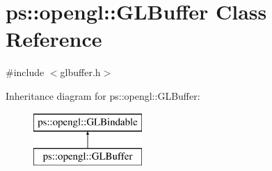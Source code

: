 \hypertarget{classps_1_1opengl_1_1GLBuffer}{}\section{ps\+:\+:opengl\+:\+:G\+L\+Buffer Class Reference}
\label{classps_1_1opengl_1_1GLBuffer}


{\ttfamily \#include $<$glbuffer.\+h$>$}

Inheritance diagram for ps\+:\+:opengl\+:\+:G\+L\+Buffer\+:\begin{figure}[H]
\begin{center}
\leavevmode
\includegraphics[height=2.000000cm]{classps_1_1opengl_1_1GLBuffer}
\end{center}
\end{figure}
